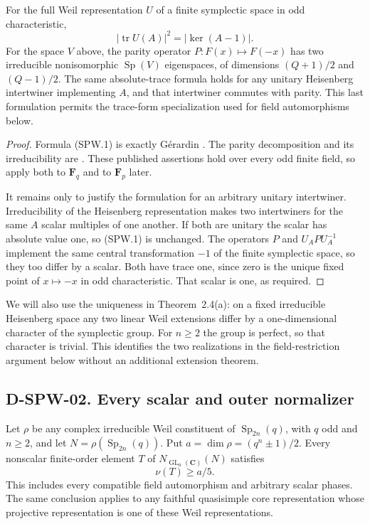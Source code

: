 \begin{lemma}
\label{D-SPW-01}
For the full Weil representation $U$ of a finite symplectic
space in odd characteristic,
\[
          |\operatorname{tr}U(A)|^2=|\ker(A-1)|.            \tag{SPW.1}
\]
For the space $V$ above, the parity operator
$P:F(x)\mapsto F(-x)$ has two irreducible nonisomorphic
$\operatorname{Sp}(V)$ eigenspaces, of dimensions
$(Q+1)/2$ and $(Q-1)/2$.
The same absolute-trace formula holds for any unitary
Heisenberg intertwiner implementing $A$, and that intertwiner
commutes with parity.  This last formulation permits the
trace-form specialization used for field automorphisms below.
\end{lemma}

\begin{proof}
Formula (SPW.1) is exactly G\'erardin
\cite[Theorem~4.4(c), pp.~84--85]{SPW:Gerardin}.
The parity decomposition and its irreducibility are
\cite[Corollary~4.4(a) and its proof, p.~85]{SPW:Gerardin}.
These published assertions hold over every odd finite field,
so apply both to $\mathbf F_q$ and to $\mathbf F_p$ later.

It remains only to justify the formulation for an arbitrary
unitary intertwiner.  Irreducibility of the Heisenberg
representation makes two intertwiners for the same $A$ scalar
multiples of one another.  If both are unitary the scalar has
absolute value one, so (SPW.1) is unchanged.
The operators $P$ and $U_A P U_A^{-1}$ implement the same
central transformation $-1$ of the finite symplectic space,
so they too differ by a scalar.  Both have trace one, since
zero is the unique fixed point of $x\mapsto-x$ in odd
characteristic.  That scalar is one, as required.
\end{proof}

We will also use the uniqueness in Theorem~2.4(a): on a fixed
irreducible Heisenberg space any two linear Weil extensions
differ by a one-dimensional character of the symplectic group.
For $n\ge2$ the group is perfect, so that character is trivial.
This identifies the two realizations in the field-restriction
argument below without an additional extension theorem.

\subsection*{D-SPW-02. Every scalar and outer normalizer}

\begin{theorem}
\label{D-SPW-02}
Let $\rho$ be any complex irreducible Weil constituent of
$\operatorname{Sp}_{2n}(q)$, with $q$ odd and $n\ge2$, and let
$N=\rho(\operatorname{Sp}_{2n}(q))$.  Put
$a=\dim\rho=(q^n\pm1)/2$.
Every nonscalar finite-order element $T$ of
$N_{\operatorname{GL}_a(\mathbf C)}(N)$ satisfies
\[
                              \nu(T)\ge a/5.               \tag{SPW.2}
\]
This includes every compatible field automorphism and arbitrary
scalar phases.  The same conclusion applies to any faithful
quasisimple core representation whose projective representation
is one of these Weil representations.
\end{theorem}

